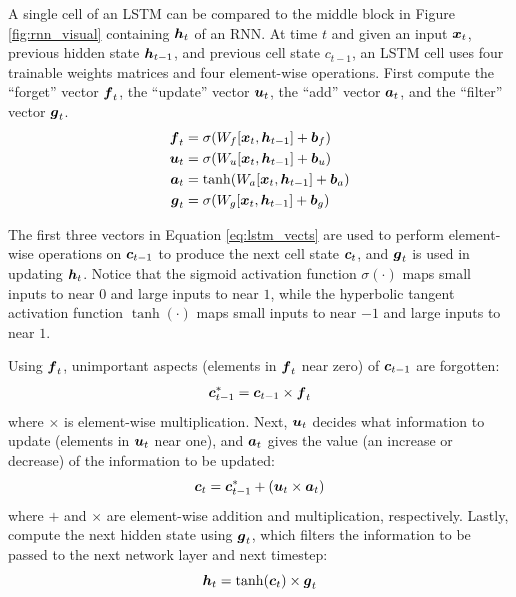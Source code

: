 A single cell of an LSTM can be compared to the middle block in Figure \ref{fig:rnn_visual} containing $\boldsymbol{h}_t$ of an RNN. At time $t$ and given an input $\boldsymbol{x}_t$, previous hidden state $\boldsymbol{h}_{t-1}$, and previous cell state $c_{t-1}$, an LSTM cell uses four trainable weights matrices and four element-wise operations. First compute the ``forget'' vector $\boldsymbol{f}_t$, the ``update'' vector $\boldsymbol{u}_t$, the ``add'' vector $\boldsymbol{a}_t$, and the ``filter'' vector $\boldsymbol{g}_t$.
\begin{equation}
\begin{split}
  \boldsymbol{f}_t &= \sigma(W_f [\boldsymbol{x}_t, \boldsymbol{h}_{t-1}] + \boldsymbol{b}_f) \\
  \boldsymbol{u}_t &= \sigma(W_u [\boldsymbol{x}_t, \boldsymbol{h}_{t-1}] + \boldsymbol{b}_u) \\
  \boldsymbol{a}_t &= \tanh(W_a [\boldsymbol{x}_t, \boldsymbol{h}_{t-1}] + \boldsymbol{b}_a) \\
  \boldsymbol{g}_t &= \sigma(W_g [\boldsymbol{x}_t, \boldsymbol{h}_{t-1}] + \boldsymbol{b}_g)
\end{split}
  \label{eq:lstm_vects}
\end{equation}

The first three vectors in Equation \ref{eq:lstm_vects} are used to perform element-wise operations on $\boldsymbol{c}_{t-1}$ to produce the next cell state $\boldsymbol{c}_t$, and $\boldsymbol{g}_t$ is used in updating $\boldsymbol{h}_t$. Notice that the sigmoid activation function $\sigma(\cdot)$ maps small inputs to near $0$ and large inputs to near $1$, while the hyperbolic tangent activation function $\tanh(\cdot)$ maps small inputs to near $-1$ and large inputs to near $1$. 

Using $\boldsymbol{f}_t$, unimportant aspects (elements in $\boldsymbol{f}_t$ near zero) of $\boldsymbol{c}_{t-1}$ are forgotten:
\begin{equation}
  \boldsymbol{c}_{t-1}^* = \boldsymbol{c}_{t-1} \times \boldsymbol{f}_t
  \label{eq:lstm_forget}
\end{equation}
where $\times$ is element-wise multiplication. Next, $\boldsymbol{u}_t$ decides what information to update (elements in $\boldsymbol{u}_t$ near one), and $\boldsymbol{a}_t$ gives the value (an increase or decrease) of the information to be updated:
\begin{equation}
  \boldsymbol{c}_t = \boldsymbol{c}_{t-1}^* + \left( \boldsymbol{u}_t \times \boldsymbol{a}_t \right)
  \label{eq:lstm_update}
\end{equation}
where $+$ and $\times$ are element-wise addition and multiplication, respectively. Lastly, compute the next hidden state using $\boldsymbol{g}_t$, which filters the information to be passed to the next network layer and next timestep:
\begin{equation}
  \boldsymbol{h}_t = \tanh(\boldsymbol{c}_t) \times \boldsymbol{g}_t
  \label{eq:lstm_filter}
\end{equation}

